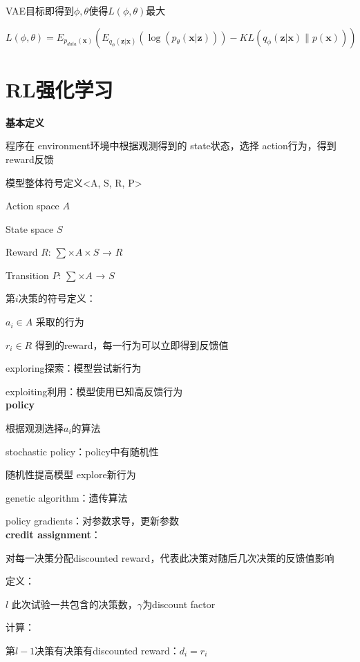 \documentclass[UTF8]{ctexart}
\begin{document}
  \quad VAE目标即得到$\phi, \theta$使得$L(\phi, \theta)$最大

  \quad \quad $L(\phi, \theta) = E_{p_{data}(\mathbf{x})}(E_{q_{\phi}(\mathbf{z} | \mathbf{x})}(\log(p_{\theta}(\mathbf{x} | \mathbf{z}))) - KL(q_{\phi}(\mathbf{z} | \mathbf{x})\| p(\mathbf{x})))$

  

\section{RL强化学习}
\noindent \textbf{基本定义}

  程序在 environment环境中根据观测得到的 state状态，选择 action行为，得到reward反馈

  模型整体符号定义<A, S, R, P>

  \quad Action space $A$
  
  \quad State space $S$
  
  \quad Reward $R$: $\sum \times A \times S$ → $R$
  
  \quad Transition $P$: $\sum \times A$ → $S$

  第$i$决策的符号定义：

  \quad $a_i \in A$ 采取的行为

  \quad $r_i \in R$ 得到的reward，每一行为可以立即得到反馈值
  
  exploring探索：模型尝试新行为
  
  exploiting利用：模型使用已知高反馈行为\\
\textbf{policy}

  根据观测选择$a_i$的算法

  stochastic policy：policy中有随机性

  \quad 随机性提高模型 explore新行为

  genetic algorithm：遗传算法

  policy gradients：对参数求导，更新参数\\
\textbf{credit assignment}：

  对每一决策分配discounted reward，代表此决策对随后几次决策的反馈值影响

  定义：

  \quad $l$ 此次试验一共包含的决策数，$\gamma$为discount factor

  计算：

  \quad 第$l-1$决策有决策有discounted reward：$d_i = r_i$
  
\end{document}
